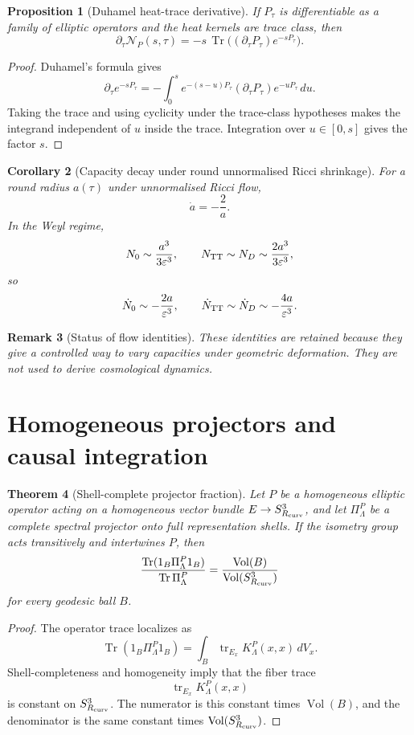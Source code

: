 \documentclass[11pt,a4paper]{article}
\newtheorem{theorem}{Theorem}[section]
\newtheorem{proposition}[theorem]{Proposition}
\newtheorem{corollary}[theorem]{Corollary}
\newtheorem{remark}[theorem]{Remark}
\newcommand{\Vol}{\operatorname{Vol}}
\newcommand{\Tr}{\operatorname{Tr}}
\begin{document}
\begin{proposition}[Duhamel heat-trace derivative]
If $P_\tau$ is differentiable as a family of elliptic operators and the heat kernels are trace class, then
\[
\partial_\tau\mathcal N_P(s,\tau)
=
-s\,\Tr\bigl((\partial_\tau P_\tau)e^{-sP_\tau}\bigr).
\]
\end{proposition}
\begin{proof}
Duhamel's formula gives
\[
\partial_\tau e^{-sP_\tau}
=
-\int_0^s e^{-(s-u)P_\tau}(\partial_\tau P_\tau)e^{-uP_\tau}\,du.
\]
Taking the trace and using cyclicity under the trace-class hypotheses makes the integrand independent of $u$ inside the trace.  Integration over $u\in[0,s]$ gives the factor $s$.
\end{proof}

\begin{corollary}[Capacity decay under round unnormalised Ricci shrinkage]
For a round radius $a(\tau)$ under unnormalised Ricci flow,
\[
\dot a=-\frac{2}{a}.
\]
In the Weyl regime,
\[
N_0\sim\frac{a^3}{3\varepsilon^3},
\qquad
N_{\rm TT}\sim N_D\sim\frac{2a^3}{3\varepsilon^3},
\]
so
\[
\dot N_0\sim-\frac{2a}{\varepsilon^3},
\qquad
\dot N_{\rm TT}\sim\dot N_D\sim-\frac{4a}{\varepsilon^3}.
\]
\end{corollary}

\begin{remark}[Status of flow identities]
These identities are retained because they give a controlled way to vary capacities under geometric deformation.  They are not used to derive cosmological dynamics.
\end{remark}


\section{Homogeneous projectors and causal integration}
\label{sec:projectors}

\begin{theorem}[Shell-complete projector fraction]
Let $P$ be a homogeneous elliptic operator acting on a homogeneous vector bundle $E\to S^3_{R_{\rm curv}}$, and let $\Pi^P_\Lambda$ be a complete spectral projector onto full representation shells.  If the isometry group acts transitively and intertwines $P$, then
\[
\frac{\Tr(1_B\Pi^P_\Lambda1_B)}{\Tr \Pi^P_\Lambda}
=
\frac{\Vol(B)}{\Vol(S^3_{R_{\rm curv}})}
\]
for every geodesic ball $B$.
\end{theorem}
\begin{proof}
The operator trace localizes as
\[
\Tr(1_B\Pi^P_\Lambda1_B)
=
\int_B\operatorname{tr}_{E_x}K_\Lambda^P(x,x)\,dV_x.
\]
Shell-completeness and homogeneity imply that the fiber trace
\[
\operatorname{tr}_{E_x}K_\Lambda^P(x,x)
\]
is constant on $S^3_{R_{\rm curv}}$.  The numerator is this constant times $\Vol(B)$, and the denominator is the same constant times $\Vol(S^3_{R_{\rm curv}})$.
\end{proof}
\end{document}
